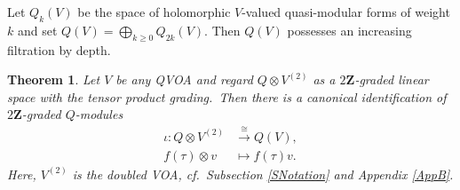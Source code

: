 \documentclass[12pt]{amsart}
\theoremstyle{plain}
\newtheorem{thm}{Theorem}[section]
\theoremstyle{definition}
\theoremstyle{remark}
\newcommand{\ZZ}{\mathbf{Z}}
\begin{document}
Let $Q_k(V)$ be the space of holomorphic $V$-valued quasi-modular forms of weight $k$ and set $Q(V) = \bigoplus_{k\geq 0}Q_{2k}(V)$. Then $Q(V)$ possesses an increasing filtration by depth.
\begin{thm}
    \label{p:QMVtensor} Let $V$ be any QVOA and regard $Q\otimes V^{(2)}$ as a $2\ZZ$-graded linear space with the tensor product grading.\ Then there is a canonical  identification of $2\ZZ$-graded $Q$-modules
    \begin{eqnarray*}
     \iota: Q\otimes V^{(2)}&\stackrel{\cong}{\longrightarrow} Q(V),\\
     f(\tau)\otimes v &\mapsto  f(\tau)v.
    \end{eqnarray*}
    Here, $V^{(2)}$ is the doubled VOA, cf.\ Subsection \ref{SNotation} and Appendix \ref{AppB}.
\end{thm}
\end{document}
